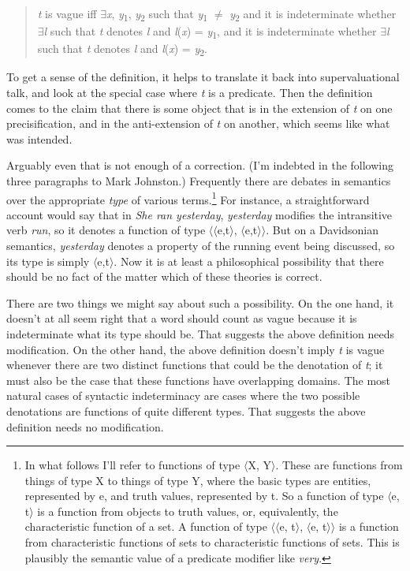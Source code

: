 \begin{quote}
\textit{t} is vague iff ${\exists}$\textit{x}, \textit{y}\textsubscript{1}, \textit{y}\textsubscript{2} such that \textit{y}\textsubscript{1} ${\neq}$ \textit{y}\textsubscript{2} and it is indeterminate whether ${\exists}$\textit{l} such that \textit{t} denotes \textit{l} and \textit{l}(\textit{x}) = \textit{y}\textsubscript{1}, and it is indeterminate whether ${\exists}$\textit{l} such that \textit{t} denotes \textit{l} and \textit{l}(\textit{x}) = \textit{y}\textsubscript{2}.
\end{quote}

\noindent To get a sense of the definition, it helps to translate it back into supervaluational talk, and look at the special case where \textit{t} is a predicate. Then the definition comes to the claim that there is some object that is in the extension of \textit{t} on one precisification, and in the anti-extension of \textit{t} on another, which seems like what was intended.

Arguably even that is not enough of a correction. (I'm indebted in the following three paragraphs to Mark Johnston.) Frequently there are debates in semantics over the appropriate \textit{type} of various terms.\footnote{In what follows I'll refer to functions of type {\(\langle\)}X, Y{\(\rangle\)}. These are functions from things of type X to things of type Y, where the basic types are entities, represented by e, and truth values, represented by t. So a function of type {\(\langle\)}e, t{\(\rangle\)} is a function from objects to truth values, or, equivalently, the characteristic function of a set. A function of type {\(\langle\)}{\(\langle\)}e, t{\(\rangle\)}, {\(\langle\)}e, t{\(\rangle\)}{\(\rangle\)} is a function from characteristic functions of sets to characteristic functions of sets. This is plausibly the semantic value of a predicate modifier like \textit{very}.} For instance, a straightforward account would say that in \textit{She ran yesterday}, \textit{yesterday} modifies the intransitive verb \textit{run}, so it denotes a function of type {\(\langle\)}{\(\langle\)}e,t{\(\rangle\)}, {\(\langle\)}e,t{\(\rangle\)}{\(\rangle\)}. But on a Davidsonian semantics, \textit{yesterday} denotes a property of the running event being discussed, so its type is simply {\(\langle\)}e,t{\(\rangle\)}. Now it is at least a philosophical possibility that there should be no fact of the matter which of these theories is correct.

There are two things we might say about such a possibility. On the one hand, it doesn't at all seem right that a word should count as vague because it is indeterminate what its type should be. That suggests the above definition needs modification. On the other hand, the above definition doesn't imply \textit{t} is vague whenever there are two distinct functions that could be the denotation of \textit{t}; it must also be the case that these functions have overlapping domains. The most natural cases of syntactic indeterminacy are cases where the two possible denotations are functions of quite different types. That suggests the above definition needs no modification.

